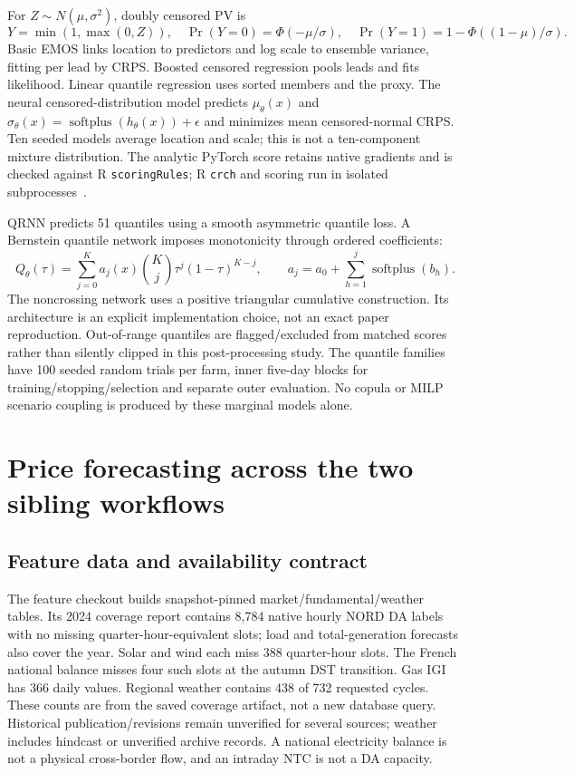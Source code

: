 For $Z\sim N(\mu,\sigma^2)$, doubly censored PV is
\begin{equation}
 Y=\min(1,\max(0,Z)),\quad
 \Pr(Y=0)=\Phi(-\mu/\sigma),\quad
 \Pr(Y=1)=1-\Phi((1-\mu)/\sigma).
\end{equation}
Basic EMOS links location to predictors and log scale to ensemble variance,
fitting per lead by CRPS. Boosted censored regression pools leads and fits
likelihood. Linear quantile regression uses sorted members and the proxy.
The neural censored-distribution model predicts $\mu_\theta(x)$ and
$\sigma_\theta(x)=\operatorname{softplus}(h_\theta(x))+\epsilon$ and minimizes
mean censored-normal CRPS. Ten seeded models average location and scale;
this is not a ten-component mixture distribution. The analytic PyTorch score
retains native gradients and is checked against R \texttt{scoringRules}; R
\texttt{crch} and scoring run in isolated subprocesses~\cite{scoring}.

QRNN predicts 51 quantiles using a smooth asymmetric quantile loss. A Bernstein
quantile network imposes monotonicity through ordered coefficients:
\begin{equation}
 Q_\theta(\tau)=\sum_{j=0}^K a_j(x)\binom{K}{j}\tau^j(1-\tau)^{K-j},
 \qquad a_j=a_0+\sum_{h=1}^j\operatorname{softplus}(b_h).
\end{equation}
The noncrossing network uses a positive triangular cumulative construction.
Its architecture is an explicit implementation choice, not an exact paper
reproduction. Out-of-range quantiles are flagged/excluded from matched scores
rather than silently clipped in this post-processing study. The quantile
families have 100 seeded random trials per farm, inner five-day blocks for
training/stopping/selection and separate outer evaluation. No copula or MILP
scenario coupling is produced by these marginal models alone.

\section{Price forecasting across the two sibling workflows}
\label{sec:price-research}

\subsection{Feature data and availability contract}
The feature checkout builds snapshot-pinned market/fundamental/weather tables.
Its 2024 coverage report contains 8,784 native hourly NORD DA labels with no
missing quarter-hour-equivalent slots; load and total-generation forecasts also
cover the year. Solar and wind each miss 388 quarter-hour slots. The French
national balance misses four such slots at the autumn DST transition. Gas IGI
has 366 daily values. Regional weather contains 438 of 732 requested cycles.
These counts are from the saved coverage artifact, not a new database query.
Historical publication/revisions remain unverified for several sources; weather
includes hindcast or unverified archive records. A national electricity balance
is not a physical cross-border flow, and an intraday NTC is not a DA capacity.

